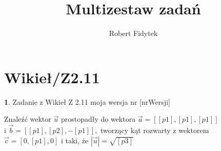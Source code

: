 \documentclass[12pt, a4paper]{article}
\title{Multizestaw zadań}
\author{Robert Fidytek}
\date{}
\theoremstyle{definition} %
\newtheorem{zad}{}
\newcommand{\kategoria}[1]{\section{#1}} %
\newcommand{\zadStart}[1]{\begin{zad}#1\newline} %
\newcommand{\zadStop}{\end{zad}}   %
\begin{document}
\maketitle


\kategoria{Wikieł/Z2.11}
\zadStart{Zadanie z Wikieł Z 2.11 moja wersja nr [nrWersji]}

Znaleźć wektor $\vec{u}$ prostopadły do wektora $\vec{a}=[[p1],[p1],[p1]]$\\ i $\vec{b}=[[p1],[p2],-[p1]],$ tworzący kąt rozwarty z wektorem $\vec{c}=[0,[p1],0]$ i taki, że $|\vec{u}|=\sqrt{[p3]}$

\zadStop
\end{document}
